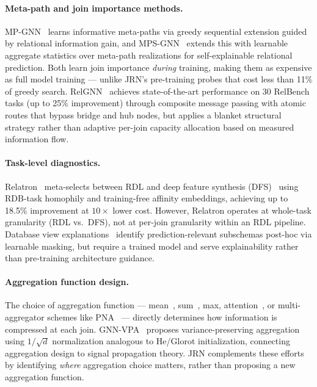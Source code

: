\documentclass[11pt,letterpaper]{article}
\begin{document}
\paragraph{Meta-path and join importance methods.}
MP-GNN~\citep{Ferrini2024a} learns informative meta-paths via greedy sequential extension guided by relational information gain, and MPS-GNN~\citep{Ferrini2024b} extends this with learnable aggregate statistics over meta-path realizations for self-explainable relational prediction. Both learn join importance \emph{during} training, making them as expensive as full model training --- unlike JRN's pre-training probes that cost less than 11\% of greedy search. RelGNN~\citep{Chen2025} achieves state-of-the-art performance on 30 RelBench tasks (up to 25\% improvement) through composite message passing with atomic routes that bypass bridge and hub nodes, but applies a blanket structural strategy rather than adaptive per-join capacity allocation based on measured information flow.

\paragraph{Task-level diagnostics.}
Relatron~\citep{Chen2026} meta-selects between RDL and deep feature synthesis (DFS)~\citep{Kanter2015} using RDB-task homophily and training-free affinity embeddings, achieving up to 18.5\% improvement at $10\times$ lower cost. However, Relatron operates at whole-task granularity (RDL vs.\ DFS), not at per-join granularity within an RDL pipeline. Database view explanations~\citep{Rissaki2025} identify prediction-relevant subschemas post-hoc via learnable masking, but require a trained model and serve explainability rather than pre-training architecture guidance.

\paragraph{Aggregation function design.}
The choice of aggregation function --- mean~\citep{Hamilton2017}, sum~\citep{Xu2019}, max, attention~\citep{Velickovic2018}, or multi-aggregator schemes like PNA~\citep{Corso2020} --- directly determines how information is compressed at each join. GNN-VPA~\citep{Schneckenreiter2024} proposes variance-preserving aggregation using $1/\sqrt{d}$ normalization analogous to He/Glorot initialization, connecting aggregation design to signal propagation theory. JRN complements these efforts by identifying \emph{where} aggregation choice matters, rather than proposing a new aggregation function.
\end{document}
